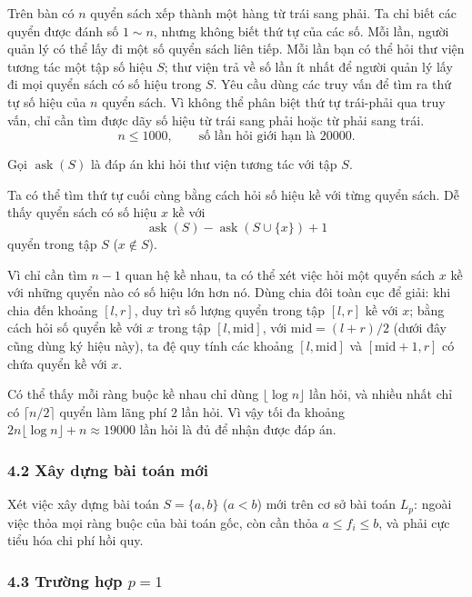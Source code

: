 \documentclass[11pt]{article}
\begin{document}
Trên bàn có \(n\) quyển sách xếp thành một hàng từ trái sang phải. Ta chỉ biết
các quyển được đánh số \(1\sim n\), nhưng không biết thứ tự của các số. Mỗi lần,
người quản lý có thể lấy đi một số quyển sách liên tiếp. Mỗi lần bạn có thể hỏi
thư viện tương tác một tập số hiệu \(S\); thư viện trả về số lần ít nhất để
người quản lý lấy đi mọi quyển sách có số hiệu trong \(S\). Yêu cầu dùng các
truy vấn để tìm ra thứ tự số hiệu của \(n\) quyển sách. Vì không thể phân biệt
thứ tự trái-phải qua truy vấn, chỉ cần tìm được dãy số hiệu từ trái sang phải
hoặc từ phải sang trái.
\[
  n\le 1000,\qquad \text{số lần hỏi giới hạn là }20000.
\]

Gọi \(\operatorname{ask}(S)\) là đáp án khi hỏi thư viện tương tác với tập
\(S\).

Ta có thể tìm thứ tự cuối cùng bằng cách hỏi số hiệu kề với từng quyển sách. Dễ
thấy quyển sách có số hiệu \(x\) kề với
\[
  \operatorname{ask}(S)-\operatorname{ask}(S\cup\{x\})+1
\]
quyển trong tập \(S\) (\(x\notin S\)).

Vì chỉ cần tìm \(n-1\) quan hệ kề nhau, ta có thể xét việc hỏi một quyển sách
\(x\) kề với những quyển nào có số hiệu lớn hơn nó. Dùng chia đôi toàn cục để
giải: khi chia đến khoảng \([l,r]\), duy trì số lượng quyển trong tập \([l,r]\)
kề với \(x\); bằng cách hỏi số quyển kề với \(x\) trong tập
\([l,\mathrm{mid}]\), với \(\mathrm{mid}=(l+r)/2\) (dưới đây cũng dùng ký hiệu
này), ta đệ quy tính các khoảng \([l,\mathrm{mid}]\) và
\([\mathrm{mid}+1,r]\) có chứa quyển kề với \(x\).

Có thể thấy mỗi ràng buộc kề nhau chỉ dùng \(\lfloor\log n\rfloor\) lần hỏi, và
nhiều nhất chỉ có \(\lceil n/2\rceil\) quyển làm lãng phí \(2\) lần hỏi. Vì vậy
tối đa khoảng \(2n\lfloor\log n\rfloor+n\approx 19000\) lần hỏi là đủ để nhận
được đáp án.

\subsubsection*{4.2 Xây dựng bài toán mới}

Xét việc xây dựng bài toán \(S=\{a,b\}\) (\(a<b\)) mới trên cơ sở bài toán
\(L_p\): ngoài việc thỏa mọi ràng buộc của bài toán gốc, còn cần thỏa
\(a\le f_i\le b\), và phải cực tiểu hóa chi phí hồi quy.

\subsubsection*{4.3 Trường hợp \(p=1\)}
\end{document}
